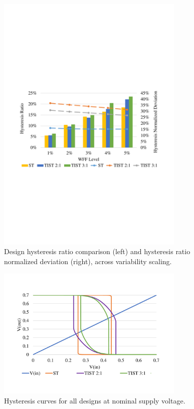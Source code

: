 \documentclass[pgmicro,diss,english]{iiufrgs}
\begin{document}
    \begin{figure}[H]
        \centering
            \includegraphics[width=0.8\textwidth, trim={1.25cm 9cm 2cm 10cm}, clip]{hystWFFComp.pdf}
            \caption{Design hysteresis ratio comparison (left) and hysteresis ratio normalized deviation (right), across variability scaling.}
        \label{figsHystComp}
    \end{figure}

    \begin{figure}[H]
        \centering
            \includegraphics[width=0.8\textwidth, trim={2cm 3cm 2cm 3cm}, clip]{hystGraphs.pdf}
            \caption{Hysteresis curves for all designs at nominal supply voltage.}
        \label{fig:hystCurves}
    \end{figure}
\end{document}
